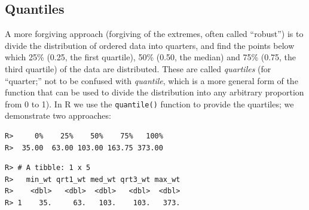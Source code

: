 \documentclass[english,10pt,a4paper,oneside]{book}
\newenvironment{Shaded}{\begin{snugshade}}{\end{snugshade}}
\newcommand{\DataTypeTok}[1]{\textcolor[rgb]{0.13,0.29,0.53}{#1}}
\newcommand{\FloatTok}[1]{\textcolor[rgb]{0.00,0.00,0.81}{#1}}
\newcommand{\KeywordTok}[1]{\textcolor[rgb]{0.13,0.29,0.53}{\textbf{#1}}}
\newcommand{\NormalTok}[1]{#1}
\newcommand{\OperatorTok}[1]{\textcolor[rgb]{0.81,0.36,0.00}{\textbf{#1}}}
\newcommand{\StringTok}[1]{\textcolor[rgb]{0.31,0.60,0.02}{#1}}
\theoremstyle{definition}
\theoremstyle{definition}
\theoremstyle{definition}
\theoremstyle{remark}
\begin{document}
\hypertarget{quantiles}{%
\subsection{Quantiles}\label{quantiles}}

A more forgiving approach (forgiving of the extremes, often called
\enquote{robust}) is to divide the distribution of ordered data into
quarters, and find the points below which 25\% (0.25, the first
quartile), 50\% (0.50, the median) and 75\% (0.75, the third quartile)
of the data are distributed. These are called \emph{quartiles} (for
\enquote{quarter;} not to be confused with \emph{quantile}, which is a
more general form of the function that can be used to divide the
distribution into any arbitrary proportion from 0 to 1). In R we use the
\texttt{quantile()} function to provide the quartiles; we demonstrate
two approaches:

\begin{Shaded}
\end{Shaded}

\begin{verbatim}
R>     0%    25%    50%    75%   100% 
R>  35.00  63.00 103.00 163.75 373.00
\end{verbatim}

\begin{Shaded}
\end{Shaded}

\begin{verbatim}
R> # A tibble: 1 x 5
R>   min_wt qrt1_wt med_wt qrt3_wt max_wt
R>    <dbl>   <dbl>  <dbl>   <dbl>  <dbl>
R> 1    35.     63.   103.    103.   373.
\end{verbatim}
\end{document}
